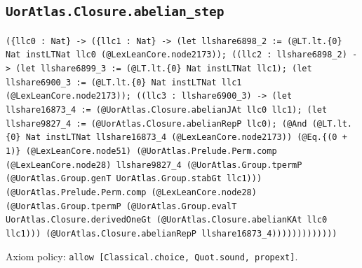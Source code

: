 \documentclass[11pt]{article}
\begin{document}
\subsection*{\texttt{UorAtlas.Closure.abelian\_step}}
\noindent\texttt{(\{llc0 : Nat\} -> (\{llc1 : Nat\} -> (let llshare6898\_2 := (@LT.lt.\{0\} Nat instLTNat llc0 (@LexLeanCore.node2173)); ((llc2 : llshare6898\_2) -> (let llshare6899\_3 := (@LT.lt.\{0\} Nat instLTNat llc1); (let llshare6900\_3 := (@LT.lt.\{0\} Nat instLTNat llc1 (@LexLeanCore.node2173)); ((llc3 : llshare6900\_3) -> (let llshare16873\_4 := (@UorAtlas.Closure.abelianJAt llc0 llc1); (let llshare9827\_4 := (@UorAtlas.Closure.abelianRepP llc0); (@And (@LT.lt.\{0\} Nat instLTNat llshare16873\_4 (@LexLeanCore.node2173)) (@Eq.\{(0 + 1)\} (@LexLeanCore.node51) (@UorAtlas.Prelude.Perm.comp (@LexLeanCore.node28) llshare9827\_4 (@UorAtlas.Group.tpermP (@UorAtlas.Group.genT UorAtlas.Group.stabGt llc1))) (@UorAtlas.Prelude.Perm.comp (@LexLeanCore.node28) (@UorAtlas.Group.tpermP (@UorAtlas.Group.evalT UorAtlas.Closure.derivedOneGt (@UorAtlas.Closure.abelianKAt llc0 llc1))) (@UorAtlas.Closure.abelianRepP llshare16873\_4)))))))))))))}\par
\noindent Axiom policy: \texttt{allow [Classical.choice, Quot.sound, propext]}.\par
\end{document}

